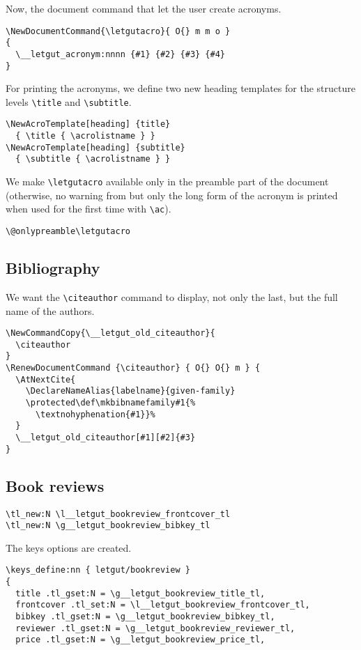\documentclass{letgut}
\begin{document}
Now, the document command that let the user create acronyms.
\begin{lstlisting}
\NewDocumentCommand{\letgutacro}{ O{} m m o }
{
  \__letgut_acronym:nnnn {#1} {#2} {#3} {#4}
}
\end{lstlisting}
For printing the acronyms, we define two new heading templates for the structure
levels \lstinline+\title+ and \lstinline+\subtitle+.
\begin{lstlisting}
\NewAcroTemplate[heading] {title}
  { \title { \acrolistname } }
\NewAcroTemplate[heading] {subtitle}
  { \subtitle { \acrolistname } }
\end{lstlisting}
We make \lstinline+\letgutacro+ available only in the preamble part of the document
(otherwise, no warning from  but only the long form of the acronym
is printed when used for the first time with \lstinline+\ac+).
\begin{lstlisting}
\@onlypreamble\letgutacro
\end{lstlisting}

\subsection{Bibliography}
\label{ImplementationBibliography-ruyg55h0jlj0}
We want the \lstinline+\citeauthor+ command to display, not only the last, but the
full name of the authors.

\begin{lstlisting}
\NewCommandCopy{\__letgut_old_citeauthor}{
  \citeauthor
}
\RenewDocumentCommand {\citeauthor} { O{} O{} m } {
  \AtNextCite{
    \DeclareNameAlias{labelname}{given-family}
    \protected\def\mkbibnamefamily#1{%
      \textnohyphenation{#1}}%
  }
  \__letgut_old_citeauthor[#1][#2]{#3}
}
\end{lstlisting}

\subsection{Book reviews}
\label{ImplementationBookreviews-ekzg55h0jlj0}
\begin{lstlisting}
\tl_new:N \l__letgut_bookreview_frontcover_tl
\tl_new:N \g__letgut_bookreview_bibkey_tl
\end{lstlisting}
The keys options are created.
\begin{lstlisting}
\keys_define:nn { letgut/bookreview }
{
  title .tl_gset:N = \g__letgut_bookreview_title_tl,
  frontcover .tl_set:N = \l__letgut_bookreview_frontcover_tl,
  bibkey .tl_gset:N = \g__letgut_bookreview_bibkey_tl,
  reviewer .tl_gset:N = \g__letgut_bookreview_reviewer_tl,
  price .tl_gset:N = \g__letgut_bookreview_price_tl,
\end{lstlisting}
\end{document}
